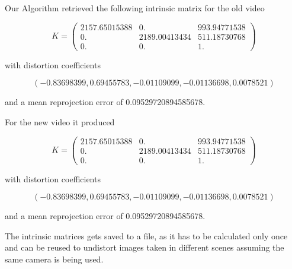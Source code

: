 \documentclass[bibliography=totoc]{scrartcl}
\begin{document}
Our Algorithm retrieved the following intrinsic matrix for the old video

$$
K =
\begin{pmatrix}
    2157.65015388 & 0. & 993.94771538 \\
    0. & 2189.00413434 & 511.18730768 \\
    0. & 0. & 1.
\end{pmatrix}
$$

with distortion coefficients

$$(-0.83698399, 0.69455783, -0.01109099, -0.01136698, 0.0078521)$$

and a mean reprojection error of 0.09529720894585678.

For the new video it produced 

$$
K =
\begin{pmatrix}
    2157.65015388 & 0. & 993.94771538 \\
    0. & 2189.00413434 & 511.18730768 \\
    0. & 0. & 1.
\end{pmatrix}
$$

with distortion coefficients

$$(-0.83698399, 0.69455783, -0.01109099, -0.01136698, 0.0078521)$$

and a mean reprojection error of 0.09529720894585678.

The intrinsic matrices gets saved to a file, as it has to be calculated only once and can be reused to undistort images taken in different scenes assuming the same camera is being used.

\clearpage


\end{document}
